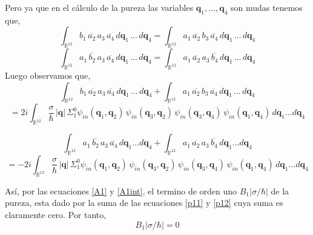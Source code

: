 \documentclass[12pt]{book}
\numberwithin{equation}{chapter}
\def\v{\mathbf}
\def\q{\mathbf{q}}
\def\n{\noindent}
\def\R{\mathbb{R}}
\begin{document}
\n Pero ya que en el c\'alculo de la pureza las variables $\v{q}_{1},...,\v{q}_{4}$ son mudas tenemos que,
$$\int_{\R^{12}} b_{1}\,\overline{a_{2}}\,a_{3}\,\overline{a_{4}} \,d\v{q}_{1}\, ...\, d\v{q}_{4}= \int_{\R^{12}} a_{1}\, \overline{a_{2}}\, b_{3}\, \overline{a_{4}} \,d\v{q}_{1}\, ... \, d\v{q}_{4} $$
$$\int_{\R^{12}} a_{1}\, \overline{b_{2}} \, a_{3} \, \overline{a_{4}} \,d\v{q}_{1}\, ... \, d\v{q}_{4}=\int_{\R^{12}} a_{1}\, \overline{a_{2}} \, a_{3}\, \overline{b_{4}} \,d\v{q}_{1}\, ...\, d\v{q}_{4} $$
Luego observamos que,
$$\int_{\R^{12}} b_{1}\,\overline{a_{2}}\,a_{3}\,\overline{a_{4}} \,d\v{q}_{1}\,...\,d\v{q}_{4} + \int_{\R^{12}} a_{1}\, \overline{a_{2}}\, b_{3}\, \overline{a_{4}} \,d\v{q}_{1}\,...\,d\v{q}_{4} $$
\begin{equation}\label{p11}
=2 i \int_{\R^{12}} \frac{\sigma}{\hbar}\,|\v{q}| \, \Sigma_{1}^{0}\psi_{in}(\q_{1},\q_{2})\, \psi_{in}(\q_{3},\q_{2}) \, \psi_{in}(\q_{3},\q_{4})\, \psi_{in}(\q_{1},\q_{4})    \,d\v{q}_{1}...d\v{q}_{4}
\end{equation}

$$\int_{\R^{12}} a_{1}\,\overline{b_{2}}\,a_{3}\,\overline{a_{4}} \,d\v{q}_{1}...d\v{q}_{4} + \int_{\R^{12}} a_{1}\, \overline{a_{2}}\, a_{3}\, \overline{b_{4}} \,d\v{q}_{1}...d\v{q}_{4} $$
\begin{equation}\label{p12}
=-2i \int_{\R^{12}} \frac{\sigma}{\hbar}\,|\v{q}| \, \Sigma_{1}^{0}\psi_{in}(\q_{1},\q_{2})\, \psi_{in}(\q_{3},\q_{2}) \, \psi_{in}(\q_{3},\q_{4})\, \psi_{in}(\q_{1},\q_{4})    \,d\v{q}_{1}...d\v{q}_{4}
\end{equation}

As\'i, por las ecuaciones \eqref{A1} y \eqref{A1int}, el termino de orden uno $B_{1}|\sigma/\hbar|$ de la pureza, esta dado por la suma de las ecuaciones \eqref{p11} y \eqref{p12} cuya suma es claramente cero. Por tanto,
\begin{equation}\label{B1}
B_{1}|\sigma/\hbar|= 0
\end{equation}

\newpage
\end{document}
